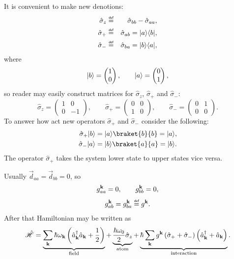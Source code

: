 It is convenient to make new denotions:
\begin{eqnarray}
	\hat{\sigma}_{z} &\myeq& \hat{\sigma}_{bb} - \hat{\sigma}_{aa}, \\
	\hat{\sigma}_{+} &\myeq& \hat{\sigma}_{ab} = \ket{a} \bra{b}, \\
	\hat{\sigma}_{-} &\myeq& \hat{\sigma}_{ba} = \ket{b} \bra{a},
\end{eqnarray}
where
\begin{equation}
	\lvert b\rangle = \begin{pmatrix}
		1 \\ 0
	\end{pmatrix}, \qquad
	\lvert a\rangle = \begin{pmatrix}
	0 \\ 1
	\end{pmatrix},
\end{equation}
so reader may easily construct matrices for $\hat{\sigma}_{z}$, $\hat{\sigma}_{+}$ and $\hat{\sigma}_{-}$:
\begin{equation}
	\hat{\sigma}_z = \begin{pmatrix}
	1 & 0 \\ 0 & -1
	\end{pmatrix}, \qquad
	\hat{\sigma}_+ = \begin{pmatrix}
	0 & 0 \\ 1 & 0
	\end{pmatrix}, \qquad
	\hat{\sigma}_- = \begin{pmatrix}
	0 & 1 \\ 0 & 0
	\end{pmatrix}.
\end{equation}
To answer how act new operators $\hat{\sigma}_{+}$ and $\hat{\sigma}_{-}$ consider the following:
\begin{eqnarray}
	\hat{\sigma}_{+} \ket{b} = \ket{a} \braket{b}{b} = \ket{a}, \\
	\hat{\sigma}_{-} \ket{a} = \ket{b} \braket{a}{a} = \ket{b}.
\end{eqnarray}
The operator $\hat{\sigma}_{+}$ takes the system lower state to upper states vice versa.

Usually $\vec{d}_{aa} = \vec{d}_{bb} = 0$, so
\begin{equation}
	g^{\mathbf{k}}_{aa} = 0, \qquad g^{\mathbf{k}}_{bb} = 0,
\end{equation}
\begin{equation}
	g^{\kv}_{ab} = g^{\kv}_{ba} \myeq g^{\kv}.
\end{equation}
After that Hamiltonian may be written as 
\begin{equation}
	\hat{\mathscr{H}} = \underbrace{\sum_{\mathbf{k}} \hbar \omega_{\mathbf{k}} \left( \hat{a}_{\mathbf{k}}^{\dagger}\hat{a}_{\mathbf{k}} + \frac{1}{2} \right)}_{\text{field}} + \underbrace{\frac{\hbar \omega_0}{2} \hat{\sigma}_z}_{\text{atom}} + \underbrace{\hbar \sum_{\mathbf{k}} g^{\mathbf{k}} \left( \hat{\sigma}_+ + \hat{\sigma}_- \right) \left( \hat{a}^{\dagger}_{\mathbf{k}} + \hat{a}_{\mathbf{k}} \right)}_{\text{interaction}}.
\end{equation}

